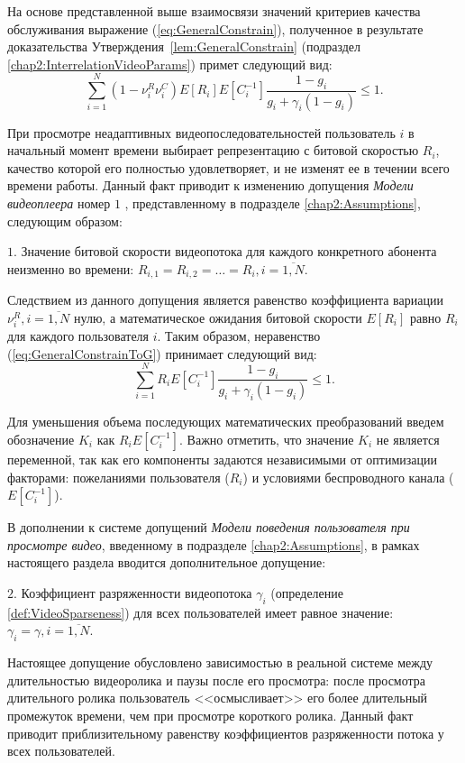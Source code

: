 На основе представленной выше взаимосвязи значений критериев качества обслуживания выражение (\ref{eq:GeneralConstrain}), полученное в результате доказательства Утверждения~\ref{lem:GeneralConstrain} (подраздел \ref{chap2:InterrelationVideoParams}) примет следующий вид:
\begin{equation}
	\label{eq:GeneralConstrainToG}
	\sum\limits_{i=1}^{N} {\left(1-\nu^R_i\nu^C_i\right)E[R_i]E[C_i^{-1}]\frac{1-g_i}{g_i + \gamma_i (1-g_i)}} \leq 1.
\end{equation}

При просмотре неадаптивных видеопоследовательностей пользователь $i$ в начальный момент времени выбирает репрезентацию с битовой скоростью $R_i$, качество которой его полностью удовлетворяет, и не изменят ее в течении всего времени работы. Данный факт приводит к изменению допущения \textit{Модели видеоплеера} номер $1$ , представленному в подразделе \ref{chap2:Assumptions}, следующим образом:

$1.$   Значение битовой скорости видеопотока для каждого конкретного абонента неизменно во времени: $R_{i,1} = R_{i,2} = \ldots = R_i, i=\overline{1,N}$.

Следствием из данного допущения является равенство коэффициента вариации $\nu^R_i, i=\overline{1,N}$ нулю, а математическое ожидания битовой скорости $E[R_i]$ равно $R_i$ для каждого пользователя $i$. Таким образом, неравенство (\ref{eq:GeneralConstrainToG}) принимает следующий вид:
$$\sum\limits_{i=1}^{N} {R_i E[C_i^{-1}]\frac{1-g_i}{g_i + \gamma_i (1-g_i)}} \leq 1.$$

Для уменьшения объема последующих математических преобразований введем обозначение $K_i$ как $R_i E[C_i^{-1}]$. Важно отметить, что значение $K_i$ не является переменной, так как его компоненты задаются независимыми от оптимизации факторами: пожеланиями пользователя ($R_i$) и условиями беспроводного канала ($E[C_i^{-1}]$).

В дополнении к системе допущений \textit{Модели поведения пользователя при просмотре видео}, введенному в подразделе \ref{chap2:Assumptions}, в рамках настоящего раздела вводится дополнительное допущение:

$2.$   Коэффициент разряженности видеопотока $\gamma_i$ (определение \ref{def:VideoSparseness}) для всех пользователей имеет равное значение: $\gamma_i = \gamma, i=\overline{1,N}$.

Настоящее допущение обусловлено зависимостью в реальной системе между длительностью видеоролика и паузы после его просмотра: после просмотра длительного ролика пользователь <<осмысливает>> его более длительный промежуток времени, чем при просмотре короткого ролика. Данный факт приводит приблизительному равенству коэффициентов разряженности потока у всех пользователей.

